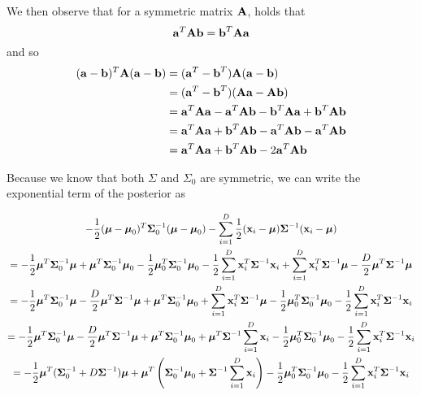 \documentclass{amsmlaj}
\begin{document}
\begin{problem}
\begin{enumerate}
	We then observe that for a symmetric matrix $\vt{A}$, holds that
	\begin{equation}
		\vt{a}^T\vt{A}\vt{b}=\vt{b}^T\vt{A}\vt{a}
	\end{equation}
	and so
	\begin{equation} \label{eq:completing-squares}
		\begin{split}
			(\vt{a}-\vt{b})^T\vt{A}(\vt{a}-\vt{b})&=(\vt{a}^T-\vt{b}^T)\vt{A}(\vt{a}-\vt{b}) \\
			&=(\vt{a}^T-\vt{b}^T)(\vt{A}\vt{a}-\vt{A}\vt{b}) \\
			&=\vt{a}^T\vt{A}\vt{a}-\vt{a}^T\vt{A}\vt{b}-\vt{b}^T\vt{A}\vt{a}+\vt{b}^T\vt{A}\vt{b} \\
			&=\vt{a}^T\vt{A}\vt{a}+\vt{b}^T\vt{A}\vt{b}-\vt{a}^T\vt{A}\vt{b}-\vt{a}^T\vt{A}\vt{b} \\
			&=\vt{a}^T\vt{A}\vt{a}+\vt{b}^T\vt{A}\vt{b}-2\vt{a}^T\vt{A}\vt{b}
		\end{split}
	\end{equation}

	Because we know that both $\Sigma$ and $\Sigma_0$ are symmetric, we can write
	the exponential term of the posterior as

	\begin{multline} \label{}
			-\frac{1}{2}(\vt{\mu}-\vt{\mu}_0)^T\vt{\Sigma}_0^{-1}(\vt{\mu}-\vt{\mu}_0)
			-\sum_{i=1}^D\frac{1}{2}(\vt{x}_i-\vt{\mu})\vt{\Sigma}^{-1}(\vt{x}_i-\vt{\mu}) \\
			=-\frac{1}{2}\vt{\mu}^T\vt{\Sigma}_0^{-1}\vt{\mu}
			+\vt{\mu}^T\vt{\Sigma}_0^{-1}\vt{\mu}_0
			-\frac{1}{2}\vt{\mu}_0^T\vt{\Sigma}_0^{-1}\vt{\mu}_0
			-\frac{1}{2}\sum_{i=1}^D\vt{x}_i^T\vt{\Sigma}^{-1}\vt{x}_i
			+\sum_{i=1}^D\vt{x}_i^T\vt{\Sigma}^{-1}\vt{\mu}
			-\frac{D}{2}\vt{\mu}^T\vt{\Sigma}^{-1}\vt{\mu} \\
			=-\frac{1}{2}\vt{\mu}^T\vt{\Sigma}_0^{-1}\vt{\mu}
			-\frac{D}{2}\vt{\mu}^T\vt{\Sigma}^{-1}\vt{\mu}
			+\vt{\mu}^T\vt{\Sigma}_0^{-1}\vt{\mu}_0
			+\sum_{i=1}^D\vt{x}_i^T\vt{\Sigma}^{-1}\vt{\mu}
			-\frac{1}{2}\vt{\mu}_0^T\vt{\Sigma}_0^{-1}\vt{\mu}_0
			-\frac{1}{2}\sum_{i=1}^D\vt{x}_i^T\vt{\Sigma}^{-1}\vt{x}_i \\
			=-\frac{1}{2}\vt{\mu}^T\vt{\Sigma}_0^{-1}\vt{\mu}
			-\frac{D}{2}\vt{\mu}^T\vt{\Sigma}^{-1}\vt{\mu}
			+\vt{\mu}^T\vt{\Sigma}_0^{-1}\vt{\mu}_0
			+\vt{\mu}^T\vt{\Sigma}^{-1}\sum_{i=1}^D\vt{x}_i
			-\frac{1}{2}\vt{\mu}_0^T\vt{\Sigma}_0^{-1}\vt{\mu}_0
			-\frac{1}{2}\sum_{i=1}^D\vt{x}_i^T\vt{\Sigma}^{-1}\vt{x}_i \\
			=-\frac{1}{2}\vt{\mu}^T(\vt{\Sigma}_0^{-1}+D\vt{\Sigma}^{-1})\vt{\mu}
			+\vt{\mu}^T\left(
				\vt{\Sigma}_0^{-1}\vt{\mu}_0+\vt{\Sigma}^{-1}\sum_{i=1}^D\vt{x}_i
			\right)
			-\frac{1}{2}\vt{\mu}_0^T\vt{\Sigma}_0^{-1}\vt{\mu}_0
			-\frac{1}{2}\sum_{i=1}^D\vt{x}_i^T\vt{\Sigma}^{-1}\vt{x}_i
	\end{multline}


\end{enumerate}
\end{problem}
\end{document}
